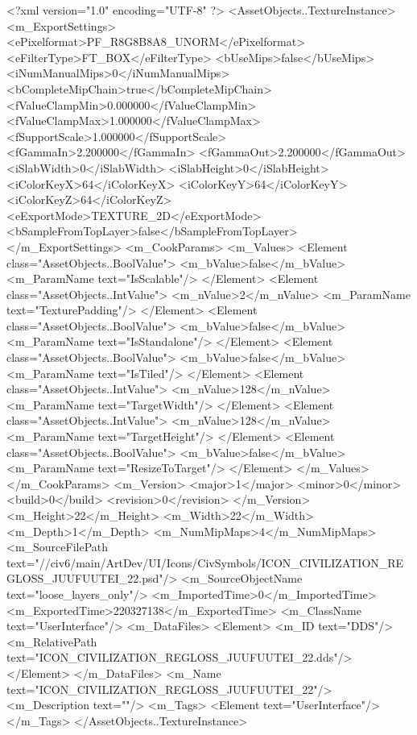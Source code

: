 <?xml version="1.0" encoding="UTF-8" ?>
<AssetObjects..TextureInstance>
	<m_ExportSettings>
		<ePixelformat>PF_R8G8B8A8_UNORM</ePixelformat>
		<eFilterType>FT_BOX</eFilterType>
		<bUseMips>false</bUseMips>
		<iNumManualMips>0</iNumManualMips>
		<bCompleteMipChain>true</bCompleteMipChain>
		<fValueClampMin>0.000000</fValueClampMin>
		<fValueClampMax>1.000000</fValueClampMax>
		<fSupportScale>1.000000</fSupportScale>
		<fGammaIn>2.200000</fGammaIn>
		<fGammaOut>2.200000</fGammaOut>
		<iSlabWidth>0</iSlabWidth>
		<iSlabHeight>0</iSlabHeight>
		<iColorKeyX>64</iColorKeyX>
		<iColorKeyY>64</iColorKeyY>
		<iColorKeyZ>64</iColorKeyZ>
		<eExportMode>TEXTURE_2D</eExportMode>
		<bSampleFromTopLayer>false</bSampleFromTopLayer>
	</m_ExportSettings>
	<m_CookParams>
		<m_Values>
			<Element class="AssetObjects..BoolValue">
				<m_bValue>false</m_bValue>
				<m_ParamName text="IsScalable"/>
			</Element>
			<Element class="AssetObjects..IntValue">
				<m_nValue>2</m_nValue>
				<m_ParamName text="TexturePadding"/>
			</Element>
			<Element class="AssetObjects..BoolValue">
				<m_bValue>false</m_bValue>
				<m_ParamName text="IsStandalone"/>
			</Element>
			<Element class="AssetObjects..BoolValue">
				<m_bValue>false</m_bValue>
				<m_ParamName text="IsTiled"/>
			</Element>
			<Element class="AssetObjects..IntValue">
				<m_nValue>128</m_nValue>
				<m_ParamName text="TargetWidth"/>
			</Element>
			<Element class="AssetObjects..IntValue">
				<m_nValue>128</m_nValue>
				<m_ParamName text="TargetHeight"/>
			</Element>
			<Element class="AssetObjects..BoolValue">
				<m_bValue>false</m_bValue>
				<m_ParamName text="ResizeToTarget"/>
			</Element>
		</m_Values>
	</m_CookParams>
	<m_Version>
		<major>1</major>
		<minor>0</minor>
		<build>0</build>
		<revision>0</revision>
	</m_Version>
	<m_Height>22</m_Height>
	<m_Width>22</m_Width>
	<m_Depth>1</m_Depth>
	<m_NumMipMaps>4</m_NumMipMaps>
	<m_SourceFilePath text="//civ6/main/ArtDev/UI/Icons/CivSymbols/ICON_CIVILIZATION_REGLOSS_JUUFUUTEI_22.psd"/>
	<m_SourceObjectName text="loose_layers_only"/>
	<m_ImportedTime>0</m_ImportedTime>
	<m_ExportedTime>220327138</m_ExportedTime>
	<m_ClassName text="UserInterface"/>
	<m_DataFiles>
		<Element>
			<m_ID text="DDS"/>
			<m_RelativePath text="ICON_CIVILIZATION_REGLOSS_JUUFUUTEI_22.dds"/>
		</Element>
	</m_DataFiles>
	<m_Name text="ICON_CIVILIZATION_REGLOSS_JUUFUUTEI_22"/>
	<m_Description text=""/>
	<m_Tags>
		<Element text="UserInterface"/>
	</m_Tags>
</AssetObjects..TextureInstance>


